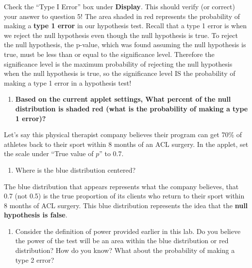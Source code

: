 \documentclass[
]{report}
\providecommand{\tightlist}{%
  \setlength{\itemsep}{0pt}\setlength{\parskip}{0pt}}
\begin{document}
Check the ``Type I Error'' box under \textbf{Display}. This should verify (or correct) your answer to question 5! The area shaded in red represents the probability of making a \textbf{type 1 error} in our hypothesis test. Recall that a type 1 error is when we reject the null hypothesis even though the null hypothesis is true. To reject the null hypothesis, the p-value, which was found assuming the null hypothesis is true, must be less than or equal to the significance level. Therefore the significance level is the maximum probability of rejecting the null hypothesis when the null hypothesis is true, so the significance level IS the probability of making a type 1 error in a hypothesis test!

\begin{enumerate}
\def\labelenumi{\arabic{enumi}.}
\setcounter{enumi}{5}
\tightlist
\item
  \textbf{Based on the current applet settings, What percent of the null distribution is shaded red (what is the probability of making a type 1 error)?}
  \vspace{0.25in}
\end{enumerate}

Let's say this physical therapist company believes their program can get 70\% of athletes back to their sport within 8 months of an ACL surgery. In the applet, set the scale under ``True value of \(p\)'' to 0.7.

\begin{enumerate}
\def\labelenumi{\arabic{enumi}.}
\setcounter{enumi}{6}
\tightlist
\item
  Where is the blue distribution centered?
  \vspace{0.25in}
\end{enumerate}

The blue distribution that appears represents what the company believes, that 0.7 (not 0.5) is the true proportion of its clients who return to their sport within 8 months of ACL surgery. This blue distribution represents the idea that the \textbf{null hypothesis is false}.

\begin{enumerate}
\def\labelenumi{\arabic{enumi}.}
\setcounter{enumi}{7}
\tightlist
\item
  Consider the definition of power provided earlier in this lab. Do you believe the power of the test will be an area within the blue distribution or red distribution? How do you know? What about the probability of making a type 2 error?
  \vspace{1in}
\end{enumerate}
\end{document}
